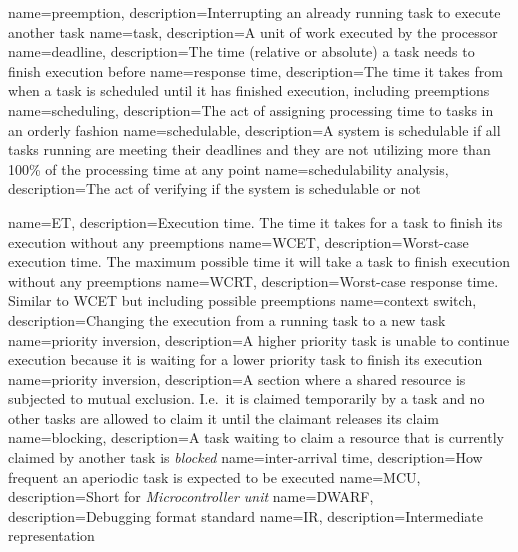 {
    name=preemption,
    description={Interrupting an already running task to execute another task}
}
{
    name=task,
    description={A unit of work executed by the processor}
}
{
    name=deadline,
    description={The time (relative or absolute) a task needs to finish execution before}
}
{
    name=response time,
    description={The time it takes from when a task is scheduled until it has finished
    execution, including preemptions}
}
{
    name=scheduling,
    description={The act of assigning processing time to tasks in an orderly fashion}
}
{
    name=schedulable,
    description={A system is schedulable if all tasks running are meeting their
    deadlines and they are not utilizing more than 100\% of the processing time
    at any point}
}
{
    name=schedulability analysis,
    description={The act of verifying if the system is schedulable or not}
}

{
    name=ET,
    description={Execution time. The time it takes for a task to finish its execution
    without any preemptions}
}
{
    name=WCET,
    description={Worst-case execution time. The maximum possible time it will
    take a task to finish execution without any preemptions}
}
{
    name=WCRT,
    description={Worst-case response time. Similar to WCET but including possible
    preemptions}
}
{
    name=context switch,
    description={Changing the execution from a running task to a new task}
}
{
    name=priority inversion,
    description={A higher priority task is unable to continue execution because
    it is waiting for a lower priority task to finish its execution}
}
{
    name=priority inversion,
    description={A section where a shared resource is subjected to mutual exclusion.
    I.e.\ it is claimed temporarily by a task and no other tasks are allowed to claim
    it until the claimant releases its claim}
}
{
    name=blocking,
    description={A task waiting to claim a resource that is currently claimed
    by another task is \emph{blocked}}
}
{
    name=inter-arrival time,
    description={How frequent an aperiodic task is expected to be executed}
}
{
    name=MCU,
    description={Short for \emph{Microcontroller unit}}
}
{
    name=DWARF,
    description={Debugging format standard}
}
{
    name=IR,
    description={Intermediate representation}
}
